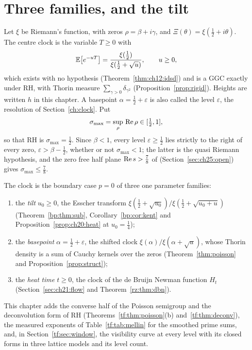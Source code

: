\section{Three families, and the tilt}\label{tf:sec:intro}

Let $\xi$ be Riemann's function, with zeros $\rho=\beta+i\gamma$, and $\Xi(\theta)=\xi(\tfrac12+i\theta)$. The centre clock is the variable $T\ge0$ with
\[
\mathbb{E}\big[e^{-uT}\big]=\frac{\xi(\tfrac12)}{\xi(\tfrac12+\sqrt u)},\qquad u\ge0,
\]
which exists with no hypothesis (Theorem~\ref{thm:ch12:idsd}) and is a GGC exactly under RH, with Thorin measure $\sum_{\gamma>0}\delta_{\gamma^2}$ (Proposition~\ref{prop:rigid}). Heights are written $h$ in this chapter. A basepoint $\alpha=\tfrac12+\varepsilon$ is also called the level $\varepsilon$, the resolution of Section~\ref{ch:clock}. Put
\[
\sigma_{\max}=\sup_\rho\,\operatorname{Re}\rho\in[\tfrac12,1],
\]
so that RH is $\sigma_{\max}=\tfrac12$. Since $\beta<1$, every level $\varepsilon\ge\tfrac12$ lies strictly to the right of every zero, $\varepsilon>\beta-\tfrac12$, whether or not $\sigma_{\max}<1$; the latter is the quasi Riemann hypothesis, and the zero free half plane $\operatorname{Re} s>\tfrac78$ of \cite{OAI26a} (Section~\ref{sec:ch25:open}) gives $\sigma_{\max}\le\tfrac78$.

The clock is the boundary case $p=0$ of three one parameter families:
\begin{enumerate}
\item[(A)] the \emph{tilt} $u_0\ge0$, the Esscher transform $\xi(\tfrac12+\sqrt{u_0})/\xi(\tfrac12+\sqrt{u_0+u})$ (Theorem~\ref{bp:thm:sub}, Corollary~\ref{bp:cor:kent} and Proposition~\ref{prop:ch20:heat} at $u_0=\tfrac14$);
\item[(B)] the \emph{basepoint} $\alpha=\tfrac12+\varepsilon$, the shifted clock $\xi(\alpha)/\xi(\alpha+\sqrt u)$, whose Thorin density is a sum of Cauchy kernels over the zeros (Theorem~\ref{thm:poisson} and Proposition~\ref{prop:struct});
\item[(C)] the \emph{heat time} $t\ge0$, the clock of the de Bruijn Newman function $H_t$ (Section~\ref{sec:ch21:flow} and Theorem~\ref{rz:thm:dbn}).
\end{enumerate}
This chapter adds the converse half of the Poisson semigroup and the deconvolution form of RH (Theorems~\ref{tf:thm:poisson}(b) and~\ref{tf:thm:deconv}), the measured exponents of Table~\ref{tf:tab:mellin} for the smoothed prime sums, and, in Section~\ref{tf:sec:window}, the visibility curve at every level with its closed forms in three lattice models and its level count.

